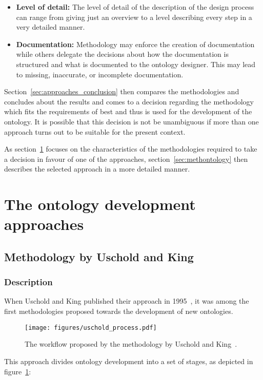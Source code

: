\begin{itemize}
\begin{itemize}
      \item \textbf{Level of detail:} The level of detail of the description of the design process can range from giving just an overview to a level describing every step in a very detailed manner.

      \item \textbf{Documentation:} Methodology may enforce the creation of documentation while others delegate the decisions about how the documentation is structured and what is documented to the ontology designer. This may lead to missing, inaccurate, or incomplete documentation.
    \end{itemize}
\end{itemize}

Section~\ref{sec:approaches_conclusion} then compares the methodologies and concludes about the results and comes to a decision regarding the methodology which fits the requirements of \thinkhomeweather best and thus is used for the development of the ontology. It is possible that this decision is not be unambiguous if more than one approach turns out to be suitable for the present context.

As section~\ref{sec:ontology_approaches} focuses on the characteristics of the methodologies required to take a decision in favour of one of the approaches, section~\ref{sec:methontology} then describes the selected approach in a more detailed manner.

\section{The ontology development approaches}
\label{sec:ontology_approaches}

\subsection{Methodology by Uschold and King}
\label{subsec:approach3}

\subsubsection{Description}

When Uschold and King published their approach in 1995~\cite{UscholdKing}, it was among the first methodologies proposed towards the development of new ontologies.

\begin{figure}
\centering
\texttt{[image: figures/uschold\_process.pdf]}
\caption{The workflow proposed by the methodology by Uschold and King~\cite{UscholdKing}.}
\label{fig:uschold_process}
\end{figure}
This approach divides ontology development into a set of stages, as depicted in figure~\ref{fig:uschold_process}:

